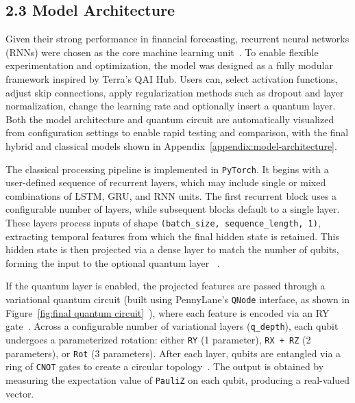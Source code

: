 \documentclass[10pt]{article}
\begin{document}
\subsection*{2.3 Model Architecture}

Given their strong performance in financial forecasting, recurrent neural networks (RNNs) were chosen as the core machine learning unit~\cite{madisson2019stockrnn, jahan2018stock}. To enable flexible experimentation and optimization, the model was designed as a fully modular framework inspired by Terra’s QAI Hub. Users can, select activation functions, adjust skip connections, apply regularization methods such as dropout and layer normalization, change the learning rate and optionally insert a quantum layer. Both the model architecture and quantum circuit are automatically visualized from configuration settings to enable rapid testing and comparison, with the final hybrid and classical models shown in Appendix~\ref{appendix:model-architecture}.


The classical processing pipeline is implemented in \texttt{PyTorch}. It begins with a user-defined sequence of recurrent layers, which may include single or mixed combinations of LSTM, GRU, and RNN units. The first recurrent block uses a configurable number of layers, while subsequent blocks default to a single layer. These layers process inputs of shape \texttt{(batch\_size, sequence\_length, 1)}, extracting temporal features from which the final hidden state is retained. This hidden state is then projected via a dense layer to match the number of qubits, forming the input to the optional quantum layer ~\cite{hochreiter1997lstm, kostadinov2017gru}.

If the quantum layer is enabled, the projected features are passed through a variational quantum circuit (built using PennyLane’s \texttt{QNode} interface, as shown in Figure~\ref{fig:final quantum circuit}~\cite{schuld2021machine}), where each feature is encoded via an RY gate~\cite{mitarai2018quantum}. Across a configurable number of variational layers (\texttt{q\_depth}), each qubit undergoes a parameterized rotation: either \texttt{RY} (1 parameter), \texttt{RX + RZ} (2 parameters), or \texttt{Rot} (3 parameters). After each layer, qubits are entangled via a ring of \texttt{CNOT} gates to create a circular topology~\cite{benedetti2019parameterized}. The output is obtained by measuring the expectation value of \texttt{PauliZ} on each qubit, producing a real-valued vector.
\end{document}
